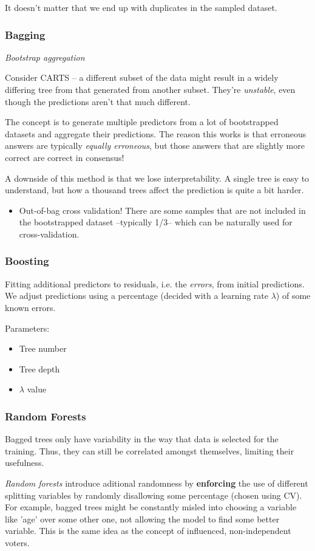 \documentclass[11pt]{article}
\begin{document}
\begin{itemize}
It doesn't matter that we end up with duplicates in the sampled dataset.
\subsubsection*{Bagging}
\label{sec-5-1-3}
\emph{Bootstrap aggregation}

Consider CARTS -- a different subset of the data might result in a widely differing tree from that generated from another subset. They're \emph{unstable}, even though the predictions aren't that much different.

The concept is to generate multiple predictors from a lot of bootstrapped datasets and aggregate their predictions. The reason this works is that erroneous answers are typically \emph{equally erroneous}, but those answers that are slightly more correct are correct in consensus!

A downside of this method is that we lose interpretability. A single tree is easy to understand, but how a thousand trees affect the prediction is quite a bit harder.
\begin{itemize}
\item Out-of-bag cross validation!
\label{sec-5-1-3-1}
There are some samples that are not included in the bootstrapped dataset --typically 1/3-- which can be naturally used for cross-validation.
\end{itemize}
\subsubsection*{Boosting}
\label{sec-5-1-4}
Fitting additional predictors to residuals, i.e. the \emph{errors}, from initial predictions. We adjust predictions using a percentage (decided with a learning rate $\lambda$) of some known errors.

Parameters:
\begin{itemize}
\item Tree number
\item Tree depth
\item $\lambda$ value
\end{itemize}
\subsubsection*{Random Forests}
\label{sec-5-1-5}
Bagged trees only have variability in the way that data is selected for the training. Thus, they can still be correlated amongst themselves, limiting their usefulness.

\emph{Random forests} introduce aditional randomness by \textbf{enforcing} the use of different splitting variables by randomly disallowing some percentage (chosen using CV). For example, bagged trees might be constantly misled into choosing a variable like 'age' over some other one, not allowing the model to find some better variable. This is the same idea as the concept of influenced, non-independent voters.


\end{itemize}
\end{document}

